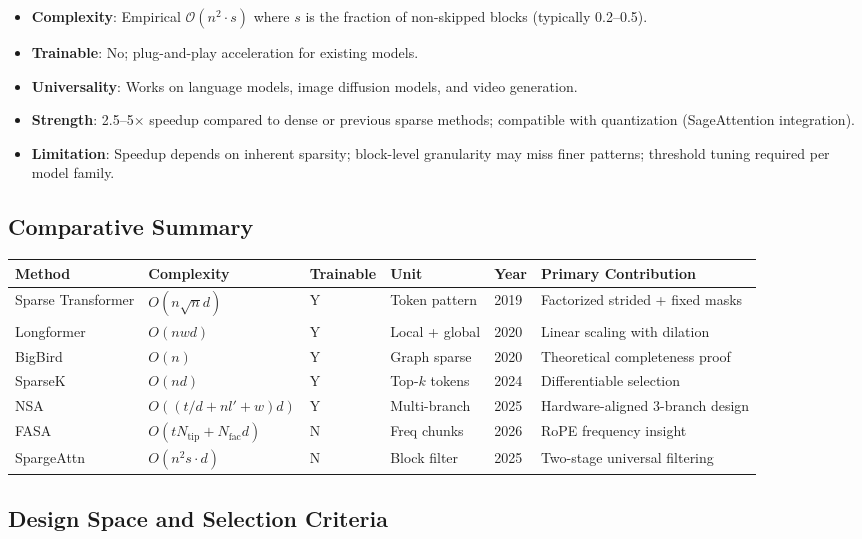 \documentclass[11pt,a4paper]{article}
\begin{document}
\begin{itemize}[leftmargin=*]
    \item \textbf{Complexity}: Empirical $\mathcal{O}(n^2 \cdot s)$ where $s$ is the fraction of non-skipped blocks (typically 0.2--0.5).
    \item \textbf{Trainable}: No; plug-and-play acceleration for existing models.
    \item \textbf{Universality}: Works on language models, image diffusion models, and video generation.
    \item \textbf{Strength}: 2.5--5$\times$ speedup compared to dense or previous sparse methods; compatible with quantization (SageAttention integration).
    \item \textbf{Limitation}: Speedup depends on inherent sparsity; block-level granularity may miss finer patterns; threshold tuning required per model family.
\end{itemize}

\subsection{Comparative Summary}

\footnotesize
\begin{longtable}{p{1.9cm}p{1.7cm}p{1.6cm}p{1.6cm}p{1.1cm}p{3.5cm}}
\toprule
\textbf{Method} & \textbf{Complexity} & \textbf{Trainable} & \textbf{Unit} & \textbf{Year} & \textbf{Primary Contribution} \\
\midrule
\endhead
Sparse Transformer & $O(n\sqrt{n}d)$ & Y & Token pattern & 2019 & Factorized strided + fixed masks \\
Longformer & $O(nwd)$ & Y & Local + global & 2020 & Linear scaling with dilation \\
BigBird & $O(n)$ & Y & Graph sparse & 2020 & Theoretical completeness proof \\
SparseK & $O(nd)$ & Y & Top-$k$ tokens & 2024 & Differentiable selection \\
NSA & $O((t/d+nl'+w)d)$ & Y & Multi-branch & 2025 & Hardware-aligned 3-branch design \\
FASA & $O(tN_{\text{tip}}+N_{\text{fac}}d)$ & N & Freq chunks & 2026 & RoPE frequency insight \\
SpargeAttn & $O(n^2 s \cdot d)$ & N & Block filter & 2025 & Two-stage universal filtering \\
\bottomrule
\end{longtable}
\normalsize

\subsection{Design Space and Selection Criteria}
\end{document}
